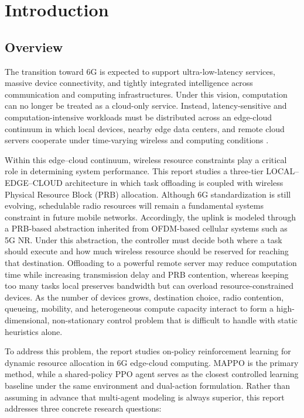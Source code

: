 \newpage
\section{Introduction}
\label{sec:introduction}

\subsection{Overview}
\label{subsec:intro-overview}

The transition toward 6G is expected to support ultra-low-latency services, massive device connectivity, and tightly integrated intelligence across communication and computing infrastructures. Under this vision, computation can no longer be treated as a cloud-only service. Instead, latency-sensitive and computation-intensive workloads must be distributed across an edge-cloud continuum in which local devices, nearby edge data centers, and remote cloud servers cooperate under time-varying wireless and computing conditions \cite{saad2020vision, satyanarayanan2017emergence, mao2017survey}.

Within this edge–cloud continuum, wireless resource constraints play a critical role in determining system performance. This report studies a three-tier LOCAL--EDGE--CLOUD architecture in which task offloading is coupled with wireless Physical Resource Block (PRB) allocation. Although 6G standardization is still evolving, schedulable radio resources will remain a fundamental systems constraint in future mobile networks. Accordingly, the uplink is modeled through a PRB-based abstraction inherited from OFDM-based cellular systems such as 5G NR. Under this abstraction, the controller must decide both where a task should execute and how much wireless resource should be reserved for reaching that destination. Offloading to a powerful remote server may reduce computation time while increasing transmission delay and PRB contention, whereas keeping too many tasks local preserves bandwidth but can overload resource-constrained devices. As the number of devices grows, destination choice, radio contention, queueing, mobility, and heterogeneous compute capacity interact to form a high-dimensional, non-stationary control problem that is difficult to handle with static heuristics alone.

To address this problem, the report studies on-policy reinforcement learning for dynamic resource allocation in 6G edge-cloud computing. MAPPO is the primary method, while a shared-policy PPO agent serves as the closest controlled learning baseline under the same environment and dual-action formulation. Rather than assuming in advance that multi-agent modeling is always superior, this report addresses three concrete research questions:

